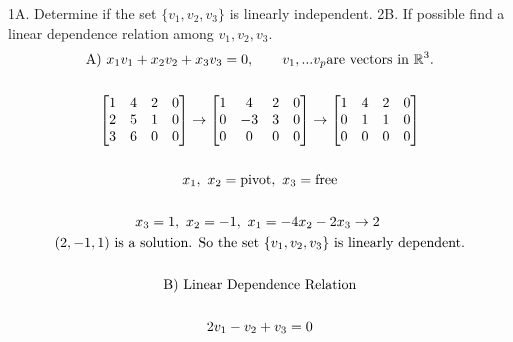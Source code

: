 \documentclass{article}
\begin{document}
  1A. Determine if the set $ \{v_{1},v_{2},v_{3}\} $ is linearly independent.
  2B. If possible find a linear dependence relation among $ v_{1},v_{2},v_{3}$.
\[
  \begin{gathered}
  \text{A) }
  x_{1}v_{1}+x_{2}v_{2}+x_{3}v_{3}=0, \qquad v_{1},...v_{p}  \text{are vectors in } \mathbb{R}^{3}.\\
  ~\\
  \begin{bmatrix}
    1 &4 &2 &0\\
    2 &5 &1 &0\\
    3 &6 &0 &0
  \end{bmatrix} \to 
  \begin{bmatrix}
    1 &4 &2 &0\\
    0 &-3 &3 &0\\
    0 &0 &0 &0
  \end{bmatrix}\to 
  \begin{bmatrix}
    1 &4 &2 &0\\
    0 &1 &1 &0\\
    0 &0 &0 &0
  \end{bmatrix}\\
  ~\\
  x_{1},~x_{2}=\text{pivot},~ x_{3} = \text{free}\\
  ~\\
  x_{3}=1,~
  x_{2}=-1,~
  x_{1}=-4x_{2}-2x_{3}\to 2
  ~\\
  (2,-1,1) \text{ is a solution. So the set } \{v_{1},v_{2},v_{3}\} \text{ is linearly dependent.}\\
  ~\\
  \text{B) Linear Dependence Relation}\\
  ~\\
  2v_{1}-v_{2}+v_{3}=0   
  \end{gathered}\\
  \]
\end{document}
